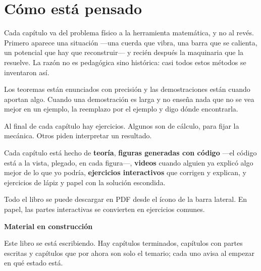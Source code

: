 \documentclass[
  spanish,
  a4paper,
]{scrbook}
\theoremstyle{definition}
\theoremstyle{plain}
\theoremstyle{definition}
\theoremstyle{plain}
\theoremstyle{definition}
\theoremstyle{remark}
\begin{document}
\section*{Cómo está pensado}\label{cuxf3mo-estuxe1-pensado}


Cada capítulo va del problema físico a la herramienta matemática, y no
al revés. Primero aparece una situación ---una cuerda que vibra, una
barra que se calienta, un potencial que hay que reconstruir--- y recién
después la maquinaria que la resuelve. La razón no es pedagógica sino
histórica: casi todos estos métodos se inventaron así.

Los teoremas están enunciados con precisión y las demostraciones están
cuando aportan algo. Cuando una demostración es larga y no enseña nada
que no se vea mejor en un ejemplo, la reemplazo por el ejemplo y digo
dónde encontrarla.

Al final de cada capítulo hay ejercicios. Algunos son de cálculo, para
fijar la mecánica. Otros piden interpretar un resultado.

Cada capítulo está hecho de \textbf{teoría}, \textbf{figuras generadas
con código} ---el código está a la vista, plegado, en cada figura---,
\textbf{videos} cuando alguien ya explicó algo mejor de lo que yo
podría, \textbf{ejercicios interactivos} que corrigen y explican, y
ejercicios de lápiz y papel con la solución escondida.

Todo el libro se puede descargar en PDF desde el ícono de la barra
lateral. En papel, las partes interactivas se convierten en ejercicios
comunes.

\begin{tcolorbox}[enhanced jigsaw, arc=.35mm, bottomrule=.15mm, breakable, colback=white, colframe=quarto-callout-note-color-frame, left=2mm, leftrule=.75mm, opacityback=0, rightrule=.15mm, toprule=.15mm]
\begin{minipage}[t]{5.5mm}
\textcolor{quarto-callout-note-color}{\faInfo}
\end{minipage}%
\begin{minipage}[t]{\textwidth - 5.5mm}

\vspace{-3mm}\textbf{Material en construcción}\vspace{3mm}

Este libro se está escribiendo. Hay capítulos terminados, capítulos con
partes escritas y capítulos que por ahora son solo el temario; cada uno
avisa al empezar en qué estado está.

\end{minipage}%
\end{tcolorbox}
\end{document}
